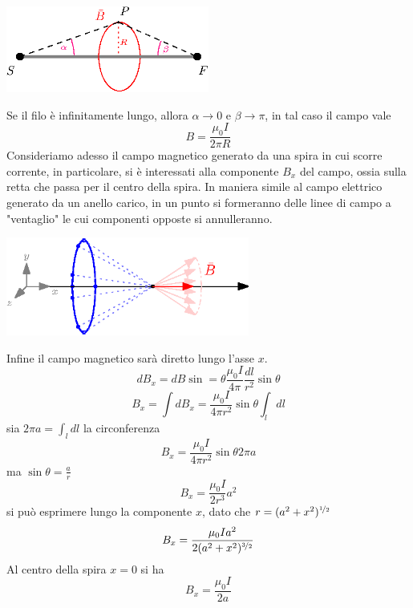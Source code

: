 \documentclass[10pt, letterpaper]{report}
\begin{document}
\begin{center}
    \includegraphics[width=0.5\textwidth ]{images/campoFilo2.eps}
\end{center}
Se il filo è infinitamente lungo, allora $\alpha\rightarrow 0$ e $\beta\rightarrow \pi$, in tal caso il campo vale 
$$ B=\frac{\mu_0I}{2\pi R}$$
Consideriamo adesso il campo magnetico generato da una spira in cui scorre corrente, in particolare, si è interessati alla componente $B_x$ del campo, ossia sulla retta che passa per il centro della spira. In maniera simile al campo elettrico generato da un anello carico, in un punto si formeranno delle linee di campo a "ventaglio" le cui componenti opposte si annulleranno.\begin{center}
    \includegraphics[width=0.6\textwidth ]{images/campoSpira.eps}
\end{center}
Infine il campo magnetico sarà diretto lungo l'asse $x$.
$$ dB_x=dB\sin=\theta\frac{\mu_0I}{4\pi}\frac{dl}{r^2}\sin\theta$$
$$ B_x=\int dB_x=\frac{\mu_0I}{4\pi r^2}\sin\theta\int_l dl$$
sia $2\pi a=\int_l dl$ la circonferenza
$$ B_x=\frac{\mu_0I}{4\pi r^2}\sin\theta 2\pi  a $$
ma $\sin\theta = \frac{a}{r}$
$$ B_x=\frac{\mu_0I}{2 r^3} a^2 $$
si può esprimere lungo la componente $x$, dato che $r=(a^2+x^2)^{\nicefrac{1}{2}}$
$$ B_x=\frac{\mu_0Ia^2}{2 (a^2+x^2)^{\nicefrac{3}{2}}} $$
Al centro della spira $x=0$ si ha 
$$ B_x=\frac{\mu_0I}{2a}$$\flowerLine
\end{document}
